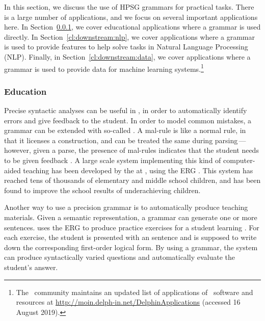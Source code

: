 \documentclass[output=paper,nonflat]{langsci/langscibook}
\begin{document}
In this section, we discuss
the use of HPSG grammars for practical tasks.
There is a large number of applications,
and we focus on several important applications here.
In Section~\ref{cl:downstream:edu},
we cover educational applications where a grammar is used directly.
In Section~\ref{cl:downstream:nlp},
we cover applications where a grammar is used to provide features
to help solve tasks in Natural Language Processing (NLP).
Finally, in Section~\ref{cl:downstream:data},
we cover applications where a grammar is used to provide data for machine learning systems.\footnote{The \delphin\ community maintains an updated list
of applications of \delphin\ software and resources at \url{http://moin.delph-in.net/DelphinApplications} (accessed 16 August 2019).}



\subsubsection{Education}
\label{cl:downstream:edu}


Precise syntactic analyses can be useful in ,
in order to automatically identify errors and give feedback to the student.
In order to model common mistakes,
a grammar can be extended with so-called \textit{}.
A mal-rule is like a normal rule, in that it licenses a construction,
and can be treated the same during parsing\,---\,however, given a parse,
the presence of mal-rules indicates that the student needs to be given feedback
\citep{Ben:Fli:Oep:04,flickinger2013error,morgadodacosta2016error}.
A large scale system implementing this kind of computer-aided teaching has been developed
by the  at ,
using the ERG \citep{suppes2014teach}.
This system has reached tens of thousands of elementary and middle school children,
and has been found to improve the school results of underachieving children.

Another way to use a precision grammar is to automatically produce teaching materials.
Given a semantic representation,
a grammar can generate one or more sentences.
\citet{Flickinger:17} uses the ERG to produce practice exercises for a student learning .
For each exercise, the student is presented with an  sentence
and is supposed to write down the corresponding first-order logical form.
By using a grammar, the system can produce syntactically varied questions
and automatically evaluate the student's answer.
\end{document}

